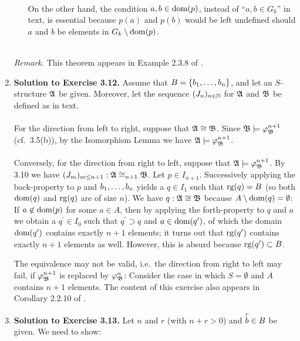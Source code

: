 \begin{enumerate}[1.]
\begin{enumerate}[(1)]
\ \\
On the other hand, the condition $a, b \in \dom{p}$, instead of ``$a, b \in G_k$'' in text, is essential because $p(a)$ and $p(b)$ would be left undefined should $a$ and $b$ be elements in $G_k \setminus \dom{p}$.
\end{enumerate}
\ \\
\textit{Remark.} This theorem appears in Example 2.3.8 of \cite{Heinz_Dieter_Ebbinghaus_and_Jorg_Flum}.
%
\item \textbf{Solution to Exercise 3.12.} Assume that $B = \{ \seq[1]{b}{n} \}$, and let an $S$-structure $\struct{A}$ be given. Moreover, let the sequence $(J_n)_{n \in \nat}$ for $\struct{A}$ and $\struct{B}$ be defined as in text.\\
\ \\
For the direction from left to right, suppose that $\struct{A} \iso \struct{B}$. Since $\struct{B} \models \varphi^{n + 1}_{\struct{B}}$ (cf.\ 3.5(b)), by the Isomorphism Lemma we have $\struct{A} \models \varphi^{n + 1}_{\struct{B}}$.\\
\ \\
Conversely, for the direction from right to left, suppose that $\struct{A} \models \varphi^{n + 1}_{\struct{B}}$. By 3.10 we have $(J_m)_{m \leq n + 1}: \struct{A} \iso_{n + 1} \struct{B}$. Let $p \in I_{n + 1}$. Successively applying the back-property to $p$ and $\seq[1]{b}{n}$ yields a $q \in I_1$ such that $\rg{q} = B$ (so both $\dom{q}$ and $\rg{q}$ are of size $n$). We have $q: \struct{A} \iso \struct{B}$ because $A \setminus \dom{q} = \emptyset$: If $a \not\in \dom{p}$ for some $a \in A$, then by applying the forth-property to $q$ and $a$ we obtain a $q^\prime \in I_0$ such that $q^\prime \supset q$ and $a \in \dom{q^\prime}$, of which the domain $\dom{q^\prime}$ contains exactly $n + 1$ elements; it turns out that $\rg{q^\prime}$ contains exactly $n + 1$ elements as well. However, this is absurd because $\rg{q^\prime} \subset B$.
\begin{remark}
The equivalence may not be valid, i.e.\ the direction from right to left may fail, if $\varphi^{n + 1}_{\struct{B}}$ is replaced by $\varphi^n_{\struct{B}}$: Consider the case in which $S = \emptyset$ and $A$ contains $n + 1$ elements. The content of this exercise also appears in Corollary 2.2.10 of \cite{Heinz_Dieter_Ebbinghaus_and_Jorg_Flum}.
\end{remark}
%
\item \textbf{Solution to Exercise 3.13.} Let $n$ and $r$ (with $n + r > 0$) and $\vect{b}{r} \in B$ be given. We need to show:\\

\end{enumerate}
